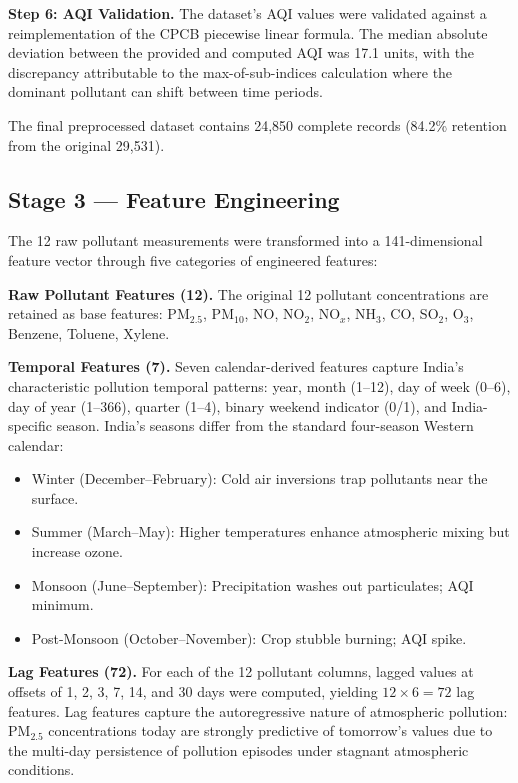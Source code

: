 \documentclass[12pt,a4paper]{report}
\begin{document}
\textbf{Step 6: AQI Validation.} The dataset's AQI values were validated against a reimplementation of the CPCB piecewise linear formula. The median absolute deviation between the provided and computed AQI was 17.1 units, with the discrepancy attributable to the max-of-sub-indices calculation where the dominant pollutant can shift between time periods.

The final preprocessed dataset contains 24,850 complete records (84.2\% retention from the original 29,531).

\subsection{Stage 3 --- Feature Engineering}

The 12 raw pollutant measurements were transformed into a 141-dimensional feature vector through five categories of engineered features:

\textbf{Raw Pollutant Features (12).} The original 12 pollutant concentrations are retained as base features: PM$_{2.5}$, PM$_{10}$, NO, NO$_2$, NO$_x$, NH$_3$, CO, SO$_2$, O$_3$, Benzene, Toluene, Xylene.

\textbf{Temporal Features (7).} Seven calendar-derived features capture India's characteristic pollution temporal patterns: year, month (1--12), day of week (0--6), day of year (1--366), quarter (1--4), binary weekend indicator (0/1), and India-specific season. India's seasons differ from the standard four-season Western calendar:
\begin{itemize}
    \item Winter (December--February): Cold air inversions trap pollutants near the surface.
    \item Summer (March--May): Higher temperatures enhance atmospheric mixing but increase ozone.
    \item Monsoon (June--September): Precipitation washes out particulates; AQI minimum.
    \item Post-Monsoon (October--November): Crop stubble burning; AQI spike.
\end{itemize}

\textbf{Lag Features (72).} For each of the 12 pollutant columns, lagged values at offsets of 1, 2, 3, 7, 14, and 30 days were computed, yielding $12 \times 6 = 72$ lag features. Lag features capture the autoregressive nature of atmospheric pollution: PM$_{2.5}$ concentrations today are strongly predictive of tomorrow's values due to the multi-day persistence of pollution episodes under stagnant atmospheric conditions.
\end{document}
